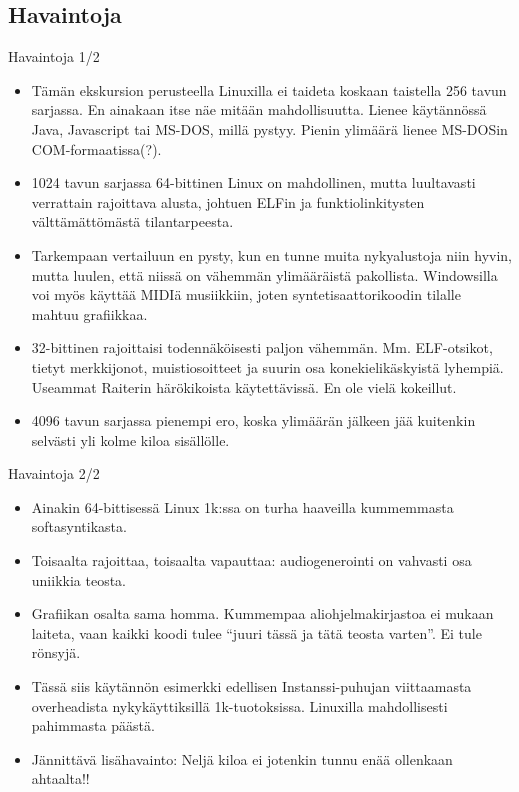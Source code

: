 \documentclass[pdf,10pt,handout]{beamer}
\begin{document}
\subsection{Havaintoja}
\begin{frame}{Havaintoja 1/2}
  \begin{itemize}
  \item Tämän ekskursion perusteella Linuxilla ei taideta koskaan
    taistella 256 tavun sarjassa. En ainakaan itse näe mitään
    mahdollisuutta. Lienee käytännössä Java, Javascript tai MS-DOS,
    millä pystyy. Pienin ylimäärä lienee MS-DOSin COM-formaatissa(?).
  \item 1024 tavun sarjassa 64-bittinen Linux on mahdollinen, mutta
    luultavasti verrattain rajoittava alusta, johtuen ELFin ja
    funktiolinkitysten välttämättömästä tilantarpeesta.
  \item Tarkempaan vertailuun en pysty, kun en tunne muita
    nykyalustoja niin hyvin, mutta luulen, että niissä on vähemmän
    ylimääräistä pakollista. Windowsilla voi myös käyttää MIDIä
    musiikkiin, joten syntetisaattorikoodin tilalle mahtuu grafiikkaa.
  \item 32-bittinen rajoittaisi todennäköisesti paljon
    vähemmän. Mm. ELF-otsikot, tietyt merkkijonot, muistiosoitteet ja
    suurin osa konekielikäskyistä lyhempiä. Useammat Raiterin
    härökikoista käytettävissä. En ole vielä kokeillut.
  \item 4096 tavun sarjassa pienempi ero, koska ylimäärän jälkeen
    jää kuitenkin selvästi yli kolme kiloa sisällölle.
  \end{itemize}
\end{frame}

\begin{frame}{Havaintoja 2/2}
  \begin{itemize}
  \item Ainakin 64-bittisessä Linux 1k:ssa on turha haaveilla
    kummemmasta softasyntikasta.
  \item Toisaalta rajoittaa, toisaalta vapauttaa: audiogenerointi on
    vahvasti osa uniikkia teosta.
  \item Grafiikan osalta sama homma. Kummempaa aliohjelmakirjastoa ei
    mukaan laiteta, vaan kaikki koodi tulee ``juuri tässä ja tätä
    teosta varten''. Ei tule rönsyjä.
  \item Tässä siis käytännön esimerkki edellisen Instanssi-puhujan
    viittaamasta overheadista nykykäyttiksillä
    1k-tuotoksissa. Linuxilla mahdollisesti pahimmasta päästä.
  \item Jännittävä lisähavainto: Neljä kiloa ei jotenkin tunnu enää
    ollenkaan ahtaalta!!
  \end{itemize}
\end{frame}
\end{document}
